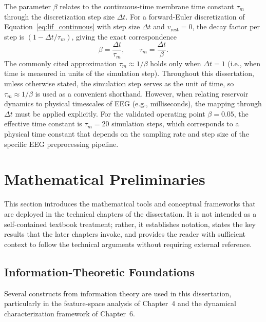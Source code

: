 The parameter $\beta$ relates to the continuous-time membrane time constant $\tau_m$ through the discretization step size $\Delta t$. For a forward-Euler discretization of Equation~\eqref{eq:lif_continuous} with step size $\Delta t$ and $v_{\text{rest}} = 0$, the decay factor per step is $(1 - \Delta t / \tau_m)$, giving the exact correspondence
\begin{equation}
    \beta = \frac{\Delta t}{\tau_m}, \qquad \tau_m = \frac{\Delta t}{\beta}.
    \label{eq:beta_tau}
\end{equation}
The commonly cited approximation $\tau_m \approx 1/\beta$ holds only when $\Delta t = 1$ (i.e., when time is measured in units of the simulation step). Throughout this dissertation, unless otherwise stated, the simulation step serves as the unit of time, so $\tau_m \approx 1/\beta$ is used as a convenient shorthand. However, when relating reservoir dynamics to physical timescales of EEG (e.g., milliseconds), the mapping through $\Delta t$ must be applied explicitly. For the validated operating point $\beta = 0.05$, the effective time constant is $\tau_m = 20$ simulation steps, which corresponds to a physical time constant that depends on the sampling rate and step size of the specific EEG preprocessing pipeline.


\section{Mathematical Preliminaries}
\label{sec:math_prelim}

This section introduces the mathematical tools and conceptual frameworks that are deployed in the technical chapters of the dissertation. It is not intended as a self-contained textbook treatment; rather, it establishes notation, states the key results that the later chapters invoke, and provides the reader with sufficient context to follow the technical arguments without requiring external reference.

\subsection{Information-Theoretic Foundations}
\label{sec:info_theory}

Several constructs from information theory are used in this dissertation, particularly in the feature-space analysis of Chapter~4 and the dynamical characterization framework of Chapter~6.

